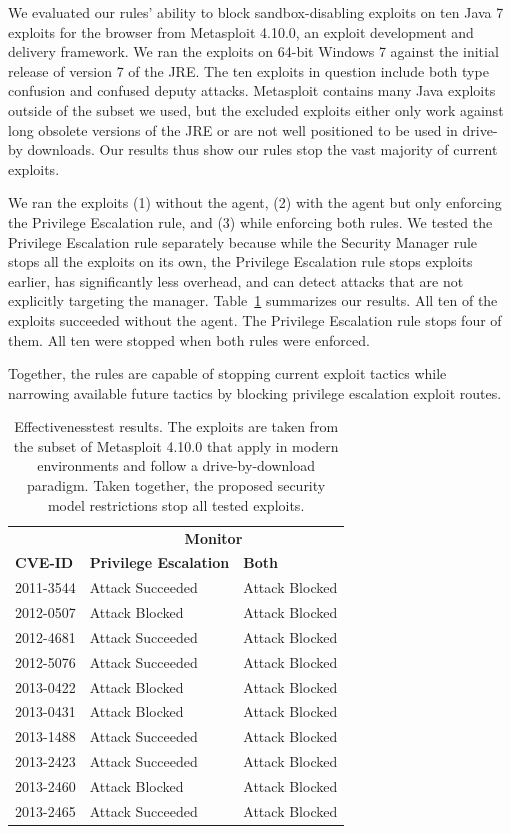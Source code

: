 \documentclass{sig-alternate}
\begin{document}
We evaluated our rules' ability to block sandbox-disabling exploits on ten
Java 7 exploits for the browser from Metasploit 4.10.0, an exploit development
and delivery framework.  We ran the exploits on 64-bit Windows 7 against the initial release of
version 7 of the JRE.  The ten exploits in question include both type confusion and confused
deputy attacks.
Metasploit contains many Java exploits outside of the 
subset we used, but the excluded exploits either only work against long obsolete
versions of the JRE or are not well positioned to be used in drive-by
downloads.  Our results thus show our rules stop the vast majority of 
current exploits.

We ran the exploits
(1) without the agent, (2) with the agent but only enforcing the Privilege
Escalation rule, and (3) while enforcing both rules.
We tested the Privilege
Escalation rule separately because while the Security Manager rule
stops all the exploits on its own, the Privilege Escalation rule 
stops exploits earlier,
has significantly less overhead, and can detect attacks that are
not explicitly targeting the manager.
 Table~\ref{tab:Exploit-experiment-summary} 
summarizes our results.  All  
ten of the exploits succeeded without the agent. The Privilege Escalation rule
stops four of them.  All ten were stopped
when both rules were enforced. 

Together, the rules are capable of stopping current exploit tactics while
narrowing available future tactics by blocking privilege escalation exploit
routes.

\begin{table}
\caption{Effectiveness\label{tab:Exploit-experiment-summary} test results.  The
  exploits are taken from the subset of Metasploit 4.10.0 that apply in modern
  environments and follow a drive-by-download paradigm.
  Taken together, the proposed security model restrictions stop all tested exploits.}
\begin{tabular}{lll}
\toprule 
                & \multicolumn{2}{c}{\textbf{Monitor}} \\
\textbf{CVE-ID} & \textbf{Privilege Escalation} & \textbf{Both}\tabularnewline
\midrule
2011-3544 & Attack Succeeded  & Attack Blocked \\
2012-0507 & Attack Blocked & Attack Blocked \\
2012-4681 & Attack Succeeded  & Attack Blocked \\
2012-5076 & Attack Succeeded  & Attack Blocked \\
2013-0422 & Attack Blocked & Attack Blocked \\
2013-0431 & Attack Blocked & Attack Blocked \\
2013-1488 & Attack Succeeded  & Attack Blocked \\
2013-2423 & Attack Succeeded  & Attack Blocked \\
2013-2460 & Attack Blocked & Attack Blocked \\
2013-2465 & Attack Succeeded  & Attack Blocked \\
\bottomrule
\end{tabular}
\vspace{-4ex}
\end{table}
\end{document}
